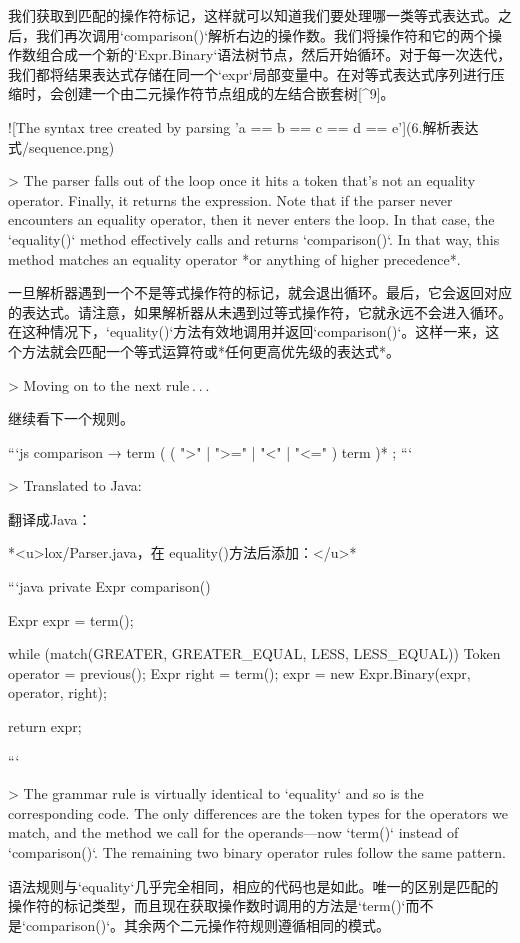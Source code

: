 \documentclass[cn,11pt,chinese]{elegantbook}
\begin{document}
我们获取到匹配的操作符标记，这样就可以知道我们要处理哪一类等式表达式。之后，我们再次调用`comparison()`解析右边的操作数。我们将操作符和它的两个操作数组合成一个新的`Expr.Binary`语法树节点，然后开始循环。对于每一次迭代，我们都将结果表达式存储在同一个`expr`局部变量中。在对等式表达式序列进行压缩时，会创建一个由二元操作符节点组成的左结合嵌套树[^9]。

![The syntax tree created by parsing 'a == b == c == d == e'](6.解析表达式/sequence.png)

> The parser falls out of the loop once it hits a token that’s not an equality operator. Finally, it returns the expression. Note that if the parser never encounters an equality operator, then it never enters the loop. In that case, the `equality()` method effectively calls and returns `comparison()`. In that way, this method matches an equality operator *or anything of higher precedence*.

一旦解析器遇到一个不是等式操作符的标记，就会退出循环。最后，它会返回对应的表达式。请注意，如果解析器从未遇到过等式操作符，它就永远不会进入循环。在这种情况下，`equality()`方法有效地调用并返回`comparison()`。这样一来，这个方法就会匹配一个等式运算符或*任何更高优先级的表达式*。

> Moving on to the next rule . . . 

继续看下一个规则。

```js
comparison     → term ( ( ">" | ">=" | "<" | "<=" ) term )* ;
```

> Translated to Java:

翻译成Java：

*<u>lox/Parser.java，在 equality()方法后添加：</u>*

```java
  private Expr comparison() {
    Expr expr = term();

    while (match(GREATER, GREATER_EQUAL, LESS, LESS_EQUAL)) {
      Token operator = previous();
      Expr right = term();
      expr = new Expr.Binary(expr, operator, right);
    }

    return expr;
  }
```

> The grammar rule is virtually identical to `equality` and so is the corresponding code. The only differences are the token types for the operators we match, and the method we call for the operands—now `term()` instead of `comparison()`. The remaining two binary operator rules follow the same pattern.

语法规则与`equality`几乎完全相同，相应的代码也是如此。唯一的区别是匹配的操作符的标记类型，而且现在获取操作数时调用的方法是`term()`而不是`comparison()`。其余两个二元操作符规则遵循相同的模式。
\end{document}
